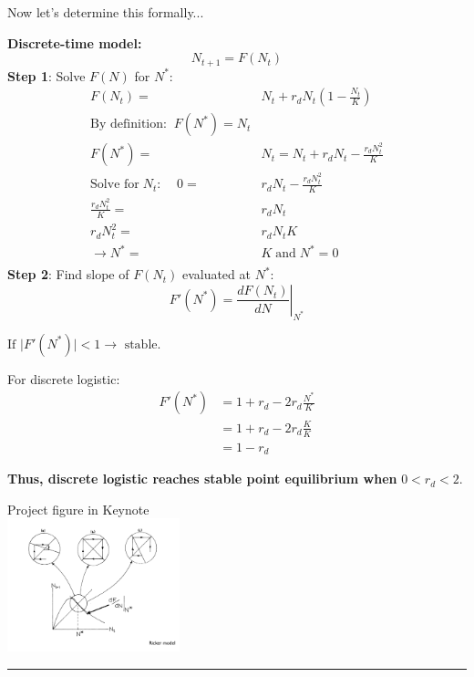 \documentclass{article}
\newcommand{\note}[1]{\colorbox{gray!30}{#1}}
\begin{document}
Now let's determine this formally...

\textbf{Discrete-time model:}
\begin{equation*}
	N_{t+1}= F(N_t)
\end{equation*}
\textbf{Step 1}:  Solve $F(N)$ for $N^*$:
\begin{align*}
	F(N_t)=& N_t+r_d N_t \left( 1-\frac{N_t}{K}\right)\\
	\text{By definition:}\; \; F(N^*)=N_t&\\
	F(N^*)=& N_t=N_t + r_d N_t - \frac{r_d N_t^2}{K}\\
	\text{Solve for} \; N_t: \;\;\;\;0=& r_d N_t-\frac{r_d N_t^2}{K}\\
	\frac{r_d N_t^2}{K}=& r_d N_t\\
	r_d N_t^2 =& r_d N_t K\\
	\to N^* =& K \; \text{and} \; N^*=0\\
\end{align*}
\textbf{Step 2}: Find slope of $F(N_t)$ evaluated at $N^*$:
\begin{equation*}
	F'(N^*)=\left.\frac{d F(N_t)}{dN}\right\vert_{N^*}
\end{equation*}
\begin{center}
$\boxed{\text{If }\vert F'(N^*)\vert <1 \to \text{ stable.}}$
\end{center}
For discrete logistic:
\begin{align*}
	F'(N^*)&=1+ r_d - 2 r_d \frac{N^*}{K}\\
	&= 1+r_d- 2 r_d \frac{K}{K}\\
	&= 1-r_d
\end{align*}
\begin{center}
\textbf{Thus, discrete logistic reaches stable point equilibrium when} $0 < r_d< 2$.
\end{center}

\begin{center}
	\note{Project figure in Keynote}\\
\includegraphics[width=5cm]{figs/RickerSlope.pdf}
\end{center}

\rule[0.5ex]{\linewidth}{1pt}
\end{document}

